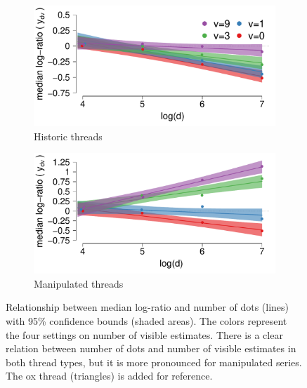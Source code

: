 \documentclass[10pt,a4paper,twocolumn,lineno]{article}
\begin{document}
\begin{figure}[ht]
\centering
	\begin{subfigure}[b]{.5\textwidth}
		\centering\includegraphics[width=\textwidth]{../plots/med_confidence_h.pdf}			
		\caption{Historic threads}\label{fig: median confidence bounds - historic}
	\end{subfigure}
	\begin{subfigure}[b]{.5\textwidth}
		\centering\includegraphics[width=\textwidth]{../plots/med_confidence_m.pdf}			
		\caption{Manipulated threads}\label{fig: median confidence bounds - manipulated}
	\end{subfigure}
		\caption{Relationship between median log-ratio and number of dots (lines) with 95\% confidence bounds (shaded areas). The colors represent the four settings on number of visible estimates. There is a clear relation between number of dots and number of visible estimates in both thread types, but it is more pronounced for manipulated series. The ox thread (triangles) is added for reference.}\label{fig: median confidence bounds}
\end{figure}
\end{document}
